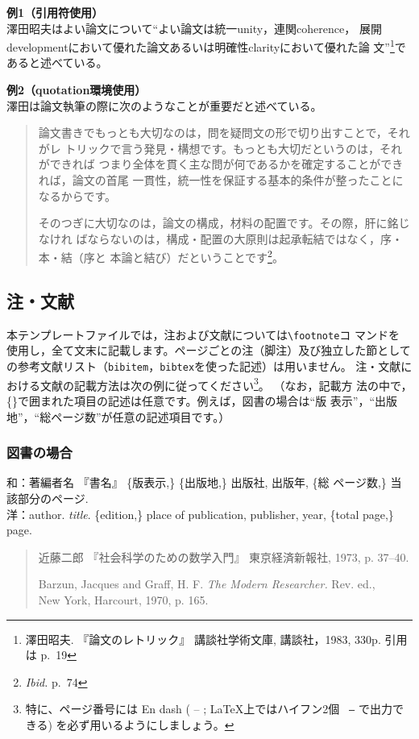 \documentclass[b5paper,10pt,twocolumn,tombow]{jarticle}
\begin{document}
\noindent{}\textbf{例1（引用符使用）}\\
澤田昭夫はよい論文について``よい論文は統一unity，連関coherence，
展開developmentにおいて優れた論文あるいは明確性clarityにおいて優れた論
文''\footnote{澤田昭夫. 『論文のレトリック』 講談社学術文庫, 講談社，1983, 330p. 引用は
p.~19}であると述べている。

\noindent{}\textbf{例2（quotation環境使用）}\\
澤田は論文執筆の際に次のようなことが重要だと述べている。
\begin{quotation}
  論文書きでもっとも大切なのは，問を疑問文の形で切り出すことで，それがレ
  トリックで言う発見・構想です。もっとも大切だというのは，それができれば
  つまり全体を貫く主な問が何であるかを確定することができれば，論文の首尾
  一貫性，統一性を保証する基本的条件が整ったことになるからです。

  そのつぎに大切なのは，論文の構成，材料の配置です。その際，肝に銘じなけれ
  ばならないのは，構成・配置の大原則は起承転結ではなく，序・本・結（序と
  本論と結び）だということです\footnote{\textit{Ibid.} p.~74}。
\end{quotation}


\subsection{注・文献} \label{123950_27Oct08}
本テンプレートファイルでは，注および文献については\verb|\footnote|コ
マンドを
使用し，全て文末に記載します。ページごとの注（脚注）及び独立した節としての参考文献リスト（\texttt{bibitem}，\texttt{bibtex}を使った記述）は用いません。
注・文献における文献の記載方法は次の例に従ってください\footnote{特に、ページ番号には En dash ( -- ; \LaTeX 上ではハイフン2個 \texttt{ --} で出力できる) を必ず用いるようにしましょう。}。
（なお，記載方
法の中で，\{\}で囲まれた項目の記述は任意です。例えば，図書の場合は``版
表示''，``出版地''，``総ページ数''が任意の記述項目です。）

\subsubsection{図書の場合}
\noindent{}和：著編者名 『書名』 \{版表示,\} \{出版地,\} 出版社, 出版年, \{総
\bigskip
ページ数,\} 当該部分のページ.\\
洋：author. \textit{title}. \{edition,\} place of publication,
publisher, year, \{total page,\} page.
\begin{quote}
 近藤二郎 『社会科学のための数学入門』 東京経済新報社, 1973,
 p. 37--40.

 Barzun, Jacques and Graff, H. F. \textit{The Modern Researcher.}
 Rev. ed., \\New York, Harcourt, 1970, p. 165.
\end{quote}
\end{document}
